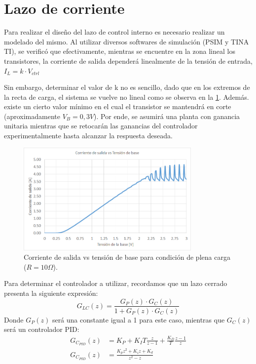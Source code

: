 \section{Lazo de corriente}
Para realizar el diseño del lazo de control interno es necesario realizar un modelado del mismo. Al utilizar diversos softwares de simulación (PSIM y TINA TI), se verificó que efectivamente, mientras se encuentre en la zona lineal los transistores, la corriente de salida dependerá linealmente de la tensión de entrada, $I_L=k\cdot V_{ctrl}$\par 
Sin embargo, determinar el valor de k no es sencillo, dado que en los extremos de la recta de carga, el sistema se vuelve no lineal como se observa en la \ref{F:Recta_de_carga_corriente}. Además. existe un cierto valor mínimo en el cual el transistor se mantendrá en corte (aproximadamente $V_B=0,3V$). Por ende, se asumirá una planta con ganancia unitaria mientras que se retocarán las ganancias del controlador experimentalmente hasta alcanzar la respuesta deseada.\par 
\begin{figure} [H]
	\centering
	\includegraphics[width=0.8\textwidth]{./imagenes/Recta_de_carga_corriente.png}
	\caption{Corriente de salida vs tensión de base para condición de plena carga ($R=10\Omega$).}
	\label{F:Recta_de_carga_corriente}
\end{figure} \par 

Para determinar el controlador a utilizar, recordamos que un lazo cerrado presenta la siguiente expresión:
\begin{equation}
G_{LC}(z)=\frac{G_P(z)\cdot G_C(z)}{1+G_P(z)\cdot G_C(z)}
\end{equation}
Donde $G_P(z)$ será una constante igual a 1 para este caso, mientras que  $G_C(z)$ será un controlador PID:
\begin{equation} 
\begin{split}
G_{C_{PID}}(z)&=K_P+K_IT\frac{z}{z-1}+\frac{K_D}{T}\frac{z-1}{z} \\
G_{C_{PID}}(z)&=\frac{K_pz^2+K_iz+K_d}{z^2-z}
\end{split}
\end{equation}\par 

